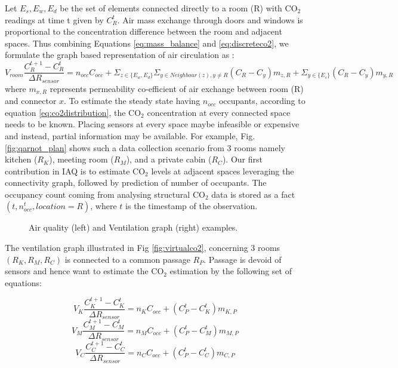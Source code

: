 Let $E_s, E_w, E_d$ be the set of elements connected directly to a room (R) with CO$_2$ readings at time t given by $C_R^t$. Air mass exchange through doors and windows is proportional to the concentration difference between the room and adjacent spaces. Thus combining Equations \ref{eq:mass_balance} and \ref{eq:discreteco2}, we formulate the graph based representation of air circulation as :
\begin{equation}
V_{room} \frac{C^{t+1}_R - C^t_R}{\Delta R_{sensor}} = n_{occ}C_{occ} + \Sigma_{z \in \{E_w, E_d\}} \Sigma_{y \in Neighbour(z), y \neq R} (C_{R} - C_y){m_{z,R}} + \Sigma_{y \in \{E_s\}} (C_{R} - C_y){m_{y,R}}
\label{eq:co2distribution}
\end{equation}
where $m_{x,R}$ represents permeability co-efficient of air exchange between room (R) and connector $x$.  To estimate the steady state having $n_{occ}$ occupants, according to equation \ref{eq:co2distribution}, the  CO$_2$ concentration at every connected space needs to be known. Placing sensors at every space maybe infeasible or expensive and instead, partial information may be available. For example, Fig. \ref{fig:qarnot_plan} shows such a data collection scenario from 3 rooms namely kitchen ($R_K$), meeting room ($R_M$), and a private cabin ($R_C$). Our first contribution in IAQ is to estimate CO$_2$ levels at adjacent spaces leveraging the connectivity graph, followed by prediction of number of occupants. The occupancy count coming from analysing structural CO$_2$ data is stored as a fact $(t, n_{occ}^t, location = R )$, where $t$ is the timestamp of the observation. 



\begin{figure}
     \centering
      \caption{Air quality (left) and Ventilation graph (right) examples.}%
\end{figure}


The ventilation graph illustrated in Fig \ref{fig:virtualco2}, concerning 3 rooms $(R_K,R_M,R_C) $ is connected to a common passage $R_P$. Passage is devoid of sensors and hence want to estimate the CO$_2$ estimation by the following set of equations:

\begin{equation}
    V_{K} \frac{C^{t+1}_K - C^t_K}{\Delta R_{sensor}} = n_{K}C_{occ} +  (C_P^t - C_K^t){m_{K,P}}
    \label{eq:co2kitchen2passage}
\end{equation}
\begin{equation}
V_{M} \frac{C^{t+1}_M - C^t_M}{\Delta R_{sensor}} = n_{M}C_{occ} +  (C_{P}^t - C_M^t){m_{M,P}}
\label{eq:co2babbage2passage}
\end{equation}
\begin{equation}
V_{C} \frac{C^{t+1}_C - C^t_C}{\Delta R_{sensor}} = n_{C}C_{occ} +  (C_{P}^t - C_C^t){m_{C,P}}
\label{eq:co2cabin2passage}
\end{equation}


